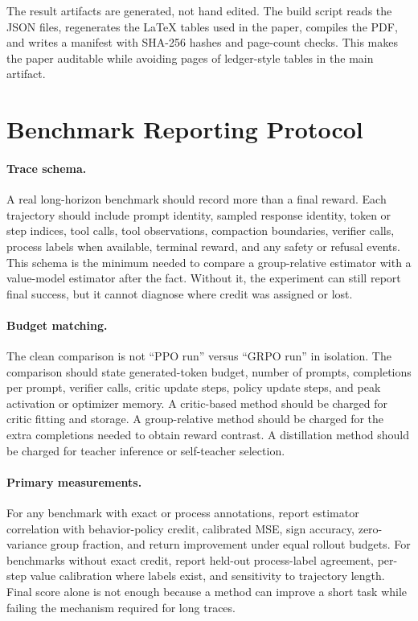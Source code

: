 \documentclass[11pt]{article}
\begin{document}
The result artifacts are generated, not hand edited. The build script reads the
JSON files, regenerates the LaTeX tables used in the paper, compiles the PDF,
and writes a manifest with SHA-256 hashes and page-count checks. This makes the
paper auditable while avoiding pages of ledger-style tables in the main
artifact.

\section{Benchmark Reporting Protocol}

\paragraph{Trace schema.}
A real long-horizon benchmark should record more than a final reward. Each
trajectory should include prompt identity, sampled response identity, token or
step indices, tool calls, tool observations, compaction boundaries, verifier
calls, process labels when available, terminal reward, and any safety or refusal
events. This schema is the minimum needed to compare a group-relative estimator
with a value-model estimator after the fact. Without it, the experiment can
still report final success, but it cannot diagnose where credit was assigned or
lost.

\paragraph{Budget matching.}
The clean comparison is not ``PPO run'' versus ``GRPO run'' in isolation. The
comparison should state generated-token budget, number of prompts, completions
per prompt, verifier calls, critic update steps, policy update steps, and peak
activation or optimizer memory. A critic-based method should be charged for
critic fitting and storage. A group-relative method should be charged for the
extra completions needed to obtain reward contrast. A distillation method should
be charged for teacher inference or self-teacher selection.

\paragraph{Primary measurements.}
For any benchmark with exact or process annotations, report estimator
correlation with behavior-policy credit, calibrated MSE, sign accuracy, zero-variance
group fraction, and return improvement under equal rollout budgets. For
benchmarks without exact credit, report held-out process-label agreement,
per-step value calibration where labels exist, and sensitivity to trajectory
length. Final score alone is not enough because a method can improve a short
task while failing the mechanism required for long traces.
\end{document}

